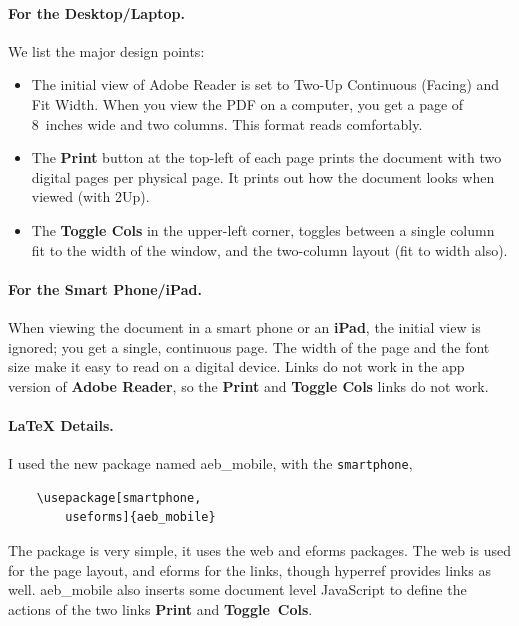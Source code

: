 \documentclass[\ifsmartphone12pt\fi,fleqn]{article}
\begin{document}
\paragraph*{\color{blue}For the Desktop/Laptop.} We list the major design
points:\vspace{-\parskip}
\begin{itemize}
\item The initial view of Adobe Reader is set to  \textsf{Two-Up
    Continuous (Facing)} and \textsf{Fit Width}. When you view the
    \textsf{PDF} on a computer, you get a page of 8~inches wide and
    two columns. This format reads comfortably.
\item The \textbf{Print} button at the top-left of each page prints the
    document with two digital pages per physical page. It prints out how the
    document looks when viewed (with 2Up).
\item The \textbf{Toggle Cols} in the upper-left corner, toggles
    between a single column fit to the width of the window, and the
    two-column layout (fit to width also).

\end{itemize}

\paragraph*{\color{blue}For the \textsf{Smart Phone/iPad}.}
When viewing the document in a smart phone or an \textbf{\textsf{iPad}}, the initial view is
ignored; you get a single, continuous page. The width of the page and
the font size make it easy to read on a digital device. Links do not work
in the app version of \textbf{Adobe Reader}, so the \textbf{Print} and \textbf{Toggle Cols}
links do not work.

\paragraph*{\color{blue}\LaTeX{} Details.}
I used the new package named \textsf{aeb\_mobile}, with the
\texttt{smart\-phone},
\begin{verbatim}
    \usepackage[smartphone,
        useforms]{aeb_mobile}
\end{verbatim}
The package is very simple, it uses the \textsf{web} and \textsf{eforms}
packages. The \textsf{web} is used for the
page layout, and \textsf{eforms} for the links, though \textsf{hyperref}
provides links as well. \textsf{aeb\_mobile} also inserts some document
level JavaScript to define the actions of the two links \textbf{Print} and
\textbf{Toggle~Cols}.
\end{document}
